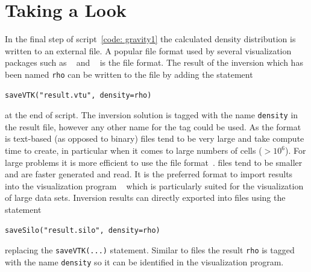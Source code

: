 \section{Taking a Look}
In the final step of script~\ref{code: gravity1} the calculated density
distribution is written to an external file.
A popular file format used by several visualization packages such as
\VisIt~\cite{VISIT} and \mayavi~\cite{MAYAVI} is the \VTK file format.
The result of the inversion which has been named \verb|rho| can be written to
the file  by adding the statement
\begin{verbatim}
saveVTK("result.vtu", density=rho)
\end{verbatim}
at the end of script.
The inversion solution is tagged with the name \verb|density| in the result
file, however any other name for the tag could be used.
As the format is text-based (as opposed to binary) \VTK files tend to be very
large and take compute time to create, in particular when it comes to large
numbers of cells ($>10^6$).
For large problems it is more efficient to use the \SILO file format~\cite{SILO}.
\SILO files tend to be smaller and are faster generated and read.
It is the preferred format to import results into the visualization program
\VisIt~\cite{VISIT} which is particularly suited for the visualization of
large data sets.
Inversion results can directly exported into \SILO files using the statement
\begin{verbatim}
saveSilo("result.silo", density=rho)
\end{verbatim}
replacing the \verb|saveVTK(...)| statement.
Similar to \VTK files the result \verb|rho| is tagged with the name
\verb|density| so it can be identified in the visualization program.

